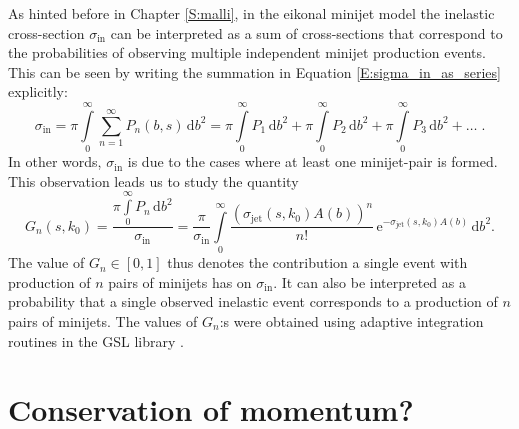 \documentclass[a4paper, twoside, english, 12pt]{report}
\begin{document}
As hinted before in Chapter \ref{S:malli}, in the eikonal minijet model the inelastic cross-section $\sigma_{\text{in}}$ can be interpreted as a sum of cross-sections that correspond to the probabilities of observing multiple independent minijet production events. This can be seen by writing the summation in Equation \eqref{E:sigma_in_as_series} explicitly:
\begin{equation}
	\sigma_\text{in} =  \pi\int\limits_0^\infty \sum\limits_{n=1}^\infty P_n(b,s)\, \text{d}b^2 = \pi\int\limits_0^\infty P_1\, \text{d}b^2 + \pi\int\limits_0^\infty P_2\, \text{d}b^2 + \pi\int\limits_0^\infty P_3\, \text{d}b^2 +\ldots \; .
\end{equation}
In other words, $\sigma_{\text{in}}$ is due to the cases where at least one minijet-pair is formed. This observation leads us to study the quantity
\begin{equation}\label{E:multiple_scatt_prob}
	G_n(s, k_0) = \frac{\pi\int\limits_0^\infty P_n\, \text{d}b^2}{\sigma_\text{in}} = \frac{\pi}{\sigma_\text{in}}\int\limits_0^\infty \frac{(\sigma_\text{jet}(s, k_0)A(b))^n}{n!}\,\text{e}^{-\sigma_\text{jet}(s, k_0)A(b)} \, \text{d}b^2.
\end{equation}
The value of $G_n\in [0,1]$ thus denotes the contribution a single event with production of $n$ pairs of minijets has on $\sigma_\text{in}$. It can also be interpreted as a probability that a single observed inelastic event corresponds to a production of $n$ pairs of minijets. The values of $G_n$:s were obtained using adaptive integration routines in the GSL library \cite{gsl}.



\section{Conservation of momentum?}\label{SS:MC}
\end{document}
